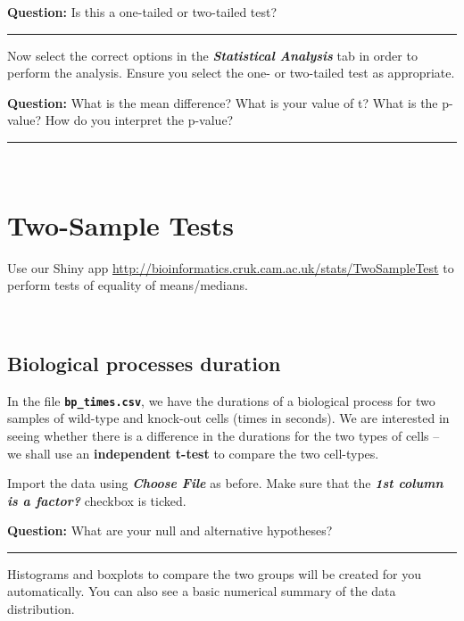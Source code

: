 \documentclass[]{article}
\begin{document}
{\textbf{Question:}} Is this a one-tailed or two-tailed test?

\begin{center}\rule{0.5\linewidth}{\linethickness}\end{center}

Now select the correct options in the \textbf{\emph{Statistical
Analysis}} tab in order to perform the analysis. Ensure you select the
one- or two-tailed test as appropriate.

{\textbf{Question:}} What is the mean difference? What is your value of
t? What is the p-value? How do you interpret the p-value?

\begin{center}\rule{0.5\linewidth}{\linethickness}\end{center}

~

\hypertarget{two-sample-tests}{%
\section{Two-Sample Tests}\label{two-sample-tests}}

Use our Shiny app
\url{http://bioinformatics.cruk.cam.ac.uk/stats/TwoSampleTest} to
perform tests of equality of means/medians.

~

\hypertarget{biological-processes-duration}{%
\subsection{Biological processes
duration}\label{biological-processes-duration}}

In the file \textbf{\texttt{bp\_times.csv}}, we have the durations of a
biological process for two samples of wild-type and knock-out cells
(times in seconds). We are interested in seeing whether there is a
difference in the durations for the two types of cells -- we shall use
an \textbf{independent t-test} to compare the two cell-types.

Import the data using \textbf{\emph{Choose File}} as before. Make sure
that the \textbf{\emph{1st column is a factor?}} checkbox is ticked.

{\textbf{Question:}} What are your null and alternative hypotheses?

\begin{center}\rule{0.5\linewidth}{\linethickness}\end{center}

Histograms and boxplots to compare the two groups will be created for
you automatically. You can also see a basic numerical summary of the
data distribution.
\end{document}

